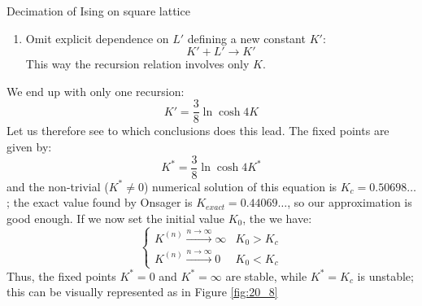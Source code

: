 \documentclass[../main/main.tex]{subfiles}
\begin{document}
\begin{example}{Decimation of Ising on square lattice}{}
\begin{enumerate}
\item Omit explicit dependence on \( L' \) defining a new constant \( K' \):
\begin{equation*}
   K'+L' \rightarrow K'
\end{equation*}
This way the recursion relation involves only \( K \).
\end{enumerate}
We end up with only one recursion:
\begin{equation*}
  K' = \frac{3}{8} \ln{\cosh 4 K}
\end{equation*}
Let us therefore see to which conclusions does this lead. The fixed points are given by:
\begin{equation*}
  K^* = \frac{3}{8} \ln{\cosh 4 K^*}
\end{equation*}
and the non-trivial (\( K^* \neq 0 \)) numerical solution of this equation is \( K_c=0.50698\dots \); the exact value found by Onsager is \( K_{exact}=
0.44069\dots \), so our approximation is good enough.
If we now set the initial value \( K_0 \), the we have:
\begin{equation*}
  \begin{cases}
   K^{(n)} \overset{n \rightarrow \infty }{\longrightarrow} \infty  & K_0 > K_c \\
   K^{(n)} \overset{n \rightarrow \infty }{\longrightarrow} 0  & K_0 < K_c
  \end{cases}
\end{equation*}
Thus, the fixed points \( K^*=0 \) and  \( K^* = \infty \)  are stable, while \( K^* = K_c \) is unstable; this can be visually represented as in Figure \ref{fig:20_8}



\end{example}
\end{document}
